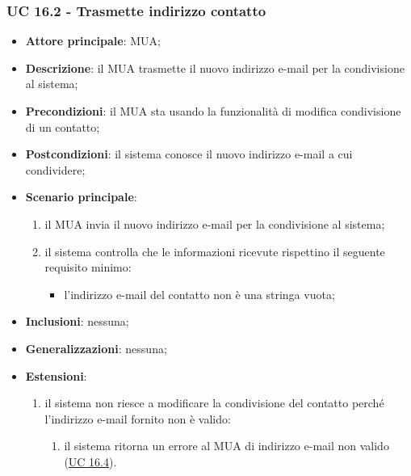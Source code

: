     \subsubsection{UC 16.2 - Trasmette indirizzo contatto} \label{sec:UC16.2}
    \begin{itemize}
        \item \textbf{Attore principale}: MUA;
        \item \textbf{Descrizione}: il MUA trasmette il nuovo indirizzo e-mail per la condivisione al sistema;
        \item \textbf{Precondizioni}: il MUA sta usando la funzionalità di modifica condivisione di un contatto;
        \item \textbf{Postcondizioni}: il sistema conosce il nuovo indirizzo e-mail a cui condividere;
        \item \textbf{Scenario principale}:
            \begin{enumerate}
                \item il MUA invia il nuovo indirizzo e-mail per la condivisione al sistema;
                \item il sistema controlla che le informazioni ricevute rispettino il seguente requisito minimo:
                    \begin{itemize}
                        \item l'indirizzo e-mail del contatto non è una stringa vuota;
                    \end{itemize}
            \end{enumerate}
        \item \textbf{Inclusioni}: nessuna;
        \item \textbf{Generalizzazioni}: nessuna;
        \item \textbf{Estensioni}:
            \begin{enumerate}[label=\alph*.]
                \item il sistema non riesce a modificare la condivisione del contatto perché l'indirizzo e-mail fornito non è valido:
                \begin{enumerate}[label=\arabic*.]
                    \item il sistema ritorna un errore al MUA di indirizzo e-mail non valido (\hyperref[sec:UC16.4]{UC 16.4}).
                \end{enumerate}
            \end{enumerate}
    \end{itemize}


